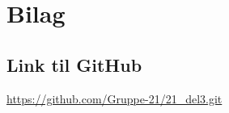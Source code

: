 \documentclass[../main.tex]{subfiles}
\begin{document}
\section{Bilag}
\subsection{Link til GitHub}
\url{https://github.com/Gruppe-21/21_del3.git}
\end{document}
